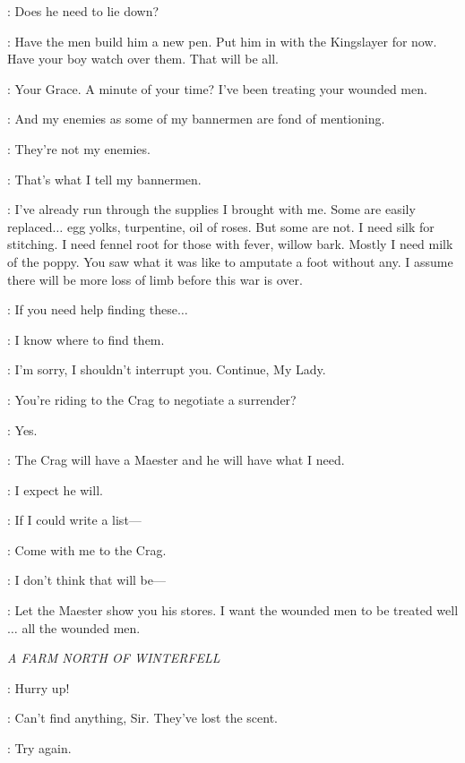 \KARSTARK: Does he need to lie down?

\ROBB: Have the men build him a new pen. Put him in with the Kingslayer for now. Have your boy watch over them. That will be all.


\TALISA: Your Grace. A minute of your time? I've been treating your wounded men.

\ROBB: And my enemies as some of my bannermen are fond of mentioning.

\TALISA: They're not my enemies.

\ROBB: That's what I tell my bannermen.

\TALISA: I've already run through the supplies I brought with me. Some are easily replaced$\ldots$ egg yolks, turpentine, oil of roses. But some are not. I need silk for stitching. I need fennel root for those with fever, willow bark. Mostly I need milk of the poppy. You saw what it was like to amputate a foot without any. I assume there will be more loss of limb before this war is over.

\ROBB: If you need help finding these$\ldots$

\TALISA: I know where to find them.

\ROBB: I'm sorry, I shouldn't interrupt you. Continue, My Lady.

\TALISA: You're riding to the Crag to negotiate a surrender?

\ROBB: Yes.

\TALISA: The Crag will have a Maester and he will have what I need.

\ROBB: I expect he will.

\TALISA: If I could write a list---

\ROBB: Come with me to the Crag.

\TALISA: I don't think that will be---

\ROBB: Let the Maester show you his stores. I want the wounded men to be treated well$\ldots$ all the wounded men.


\scene

\textit{A FARM NORTH OF WINTERFELL}


\THEON: Hurry up!

\DAGMER: Can't find anything, Sir. They've lost the scent.

\THEON: Try again.

